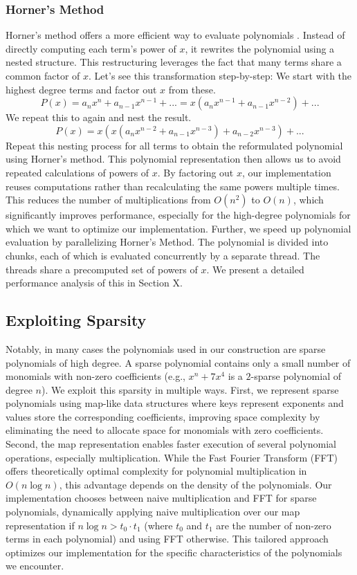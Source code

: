\subsubsection{Horner's Method}
Horner's method offers a more efficient way to evaluate polynomials \cite{horner1819xxi}. Instead of directly computing each term's power of $x$, it rewrites the polynomial using a nested structure. This restructuring leverages the fact that many terms share a common factor of $x$. Let's see this transformation step-by-step: We start with the highest degree terms and factor out $x$ from these.
$$
P(x) = a_n x^n + a_{n-1} x^{n-1} + ... = x(a_n x^{n-1} + a_{n-1} x^{n-2}) + ...
$$
We repeat this to again and nest the result.
$$
P(x) = x(x(a_n x^{n-2} + a_{n-1} x^{n-3}) + a_{n-2}x^{n-3}) + ...
$$
Repeat this nesting process for all terms to obtain the reformulated polynomial using Horner's method. This polynomial representation then allows us to avoid repeated calculations of powers of $x$. By factoring out $x$, our implementation reuses computations rather than recalculating the same powers multiple times. This reduces the number of multiplications from $O(n^2)$ to $O(n)$, which significantly improves performance, especially for the high-degree polynomials for which we want to optimize our implementation. Further, we speed up polynomial evaluation by parallelizing Horner's Method. The polynomial is divided into chunks, each of which is evaluated concurrently by a separate thread. The threads share a precomputed set of powers of $x$. We present a detailed performance analysis of this in Section \todo X.

\subsection{Exploiting Sparsity}
Notably, in many cases the polynomials used in our construction are sparse polynomials of high degree. A sparse polynomial contains only a small number of monomials with non-zero coefficients (e.g., $x^n + 7x^4$ is a $2$-sparse polynomial of degree $n$). We exploit this sparsity in multiple ways. First, we represent sparse polynomials using map-like data structures where keys represent exponents and values store the corresponding coefficients, improving space complexity by eliminating the need to allocate space for monomials with zero coefficients. Second, the map representation enables faster execution of several polynomial operations, especially multiplication. While the Fast Fourier Transform (FFT) offers theoretically optimal complexity for polynomial multiplication in $O(n \log n)$, this advantage depends on the density of the polynomials. Our implementation chooses between naive multiplication and FFT for sparse polynomials, dynamically applying naive multiplication over our map representation if $n\log n > t_0 \cdot t_1$ (where $t_0$ and $t_1$ are the number of non-zero terms in each polynomial) and using FFT otherwise. This tailored approach optimizes our implementation for the specific characteristics of the polynomials we encounter. 

